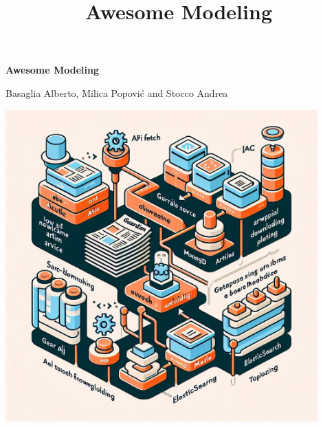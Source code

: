 \documentclass{article}
\title{Awesome Modeling}
\begin{document}
\begin{titlepage}
    \centering
    \vspace*{\fill}

    \vspace*{0.5cm}

    \huge\bfseries
        Awesome Modeling

    \vspace*{0.5cm}

    \large Basaglia Alberto, Milica Popović and Stocco Andrea

    \vspace*{2cm}

    \includegraphics[width=12cm]{front.jpeg} %

    \vspace*{\fill}
\end{titlepage}

\newpage



\clearpage
\newpage


\clearpage
\newpage


\clearpage
\newpage


\clearpage
\newpage


\clearpage
\newpage


\clearpage
\newpage




\appendix
\end{document}
